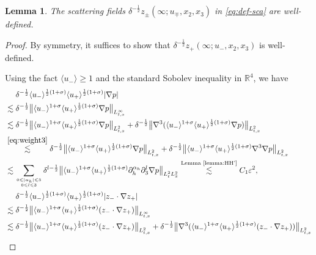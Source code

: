 \documentclass[10pt,reqno]{amsart}
\numberwithin{equation}{section}
\newtheorem{lemma}[theorem]{Lemma}
\begin{document}
\begin{lemma}\label{welldefined}
The scattering fields $\delta^{-\frac{1}{2}}z_{\pm}(\infty;u_\mp,x_2,x_3)$ in \eqref{eq:def-sca} are well-defined.
\end{lemma}
\begin{proof}
By symmetry, it suffices to show that $\delta^{-\frac{1}{2}}z_{+}(\infty;u_-,x_2,x_3)$ is well-defined. 

Using the fact $\langle u_-\rangle\geqslant 1$ and the standard Sobolev inequality in $\mathbb{R}^4$, we have 
\begin{align*}
&\ \ \ \ \delta^{-\frac{1}{2}}\langle u_-\rangle^{\frac{1}{2}(1+\sigma)}\langle u_+\rangle^{\frac{1}{2}(1+\sigma)} |\nabla p|\\
&\lesssim\delta^{-\frac{1}{2}}\big\|\langle u_-\rangle^{1+\sigma}\langle u_+\rangle^{\frac{1}{2}(1+\sigma)} \nabla p\big\|_{L^\infty_{t,x}}\\
&\lesssim\delta^{-\frac{1}{2}}\big\|\langle u_-\rangle^{1+\sigma}\langle u_+\rangle^{\frac{1}{2}(1+\sigma)} \nabla p\big\|_{L^2_{t,x}}+\delta^{-\frac{1}{2}}\big\|\nabla^3(\langle u_-\rangle^{1+\sigma}\langle u_+\rangle^{\frac{1}{2}(1+\sigma)} \nabla p)\big\|_{L^2_{t,x}}\\
&\stackrel{\eqref{eq:weight3}}{\lesssim}\delta^{-\frac{1}{2}}\big\|\langle u_-\rangle^{1+\sigma}\langle u_+\rangle^{\frac{1}{2}(1+\sigma)} \nabla p\big\|_{L^2_{t,x}}+\delta^{-\frac{1}{2}}\big\|\langle u_-\rangle^{1+\sigma}\langle u_+\rangle^{\frac{1}{2}(1+\sigma)} \nabla^3 \nabla p\big\|_{L^2_{t,x}}\\
&\lesssim
\sum_{0\leqslant|\alpha_h|\leqslant 3\atop 0\leqslant l\leqslant 3}\delta^{l-\frac{1}{2}}\big\|\langle u_-\rangle^{1+\sigma}\langle u_+\rangle^{\frac{1}{2}(1+\sigma)}\partial_{h}^{\alpha_h}\partial_3^l \nabla p\big\|_{L^2_tL^2_x}
\stackrel{\text{Lemma \ref{lemma:HH'}}}{\lesssim}C_1\varepsilon^2,\\
	&\ \ \ \ \delta^{-\frac{1}{2}}\langle u_-\rangle^{\frac{1}{2}(1+\sigma)}\langle u_+\rangle^{\frac{1}{2}(1+\sigma)} |z_-\cdot\nabla z_+|\\
	&\lesssim \delta^{-\frac{1}{2}}\big\|\langle u_-\rangle^{1+\sigma}\langle u_+\rangle^{\frac{1}{2}(1+\sigma)} (z_-\cdot\nabla z_+)\big\|_{L^\infty_{t,x}}\\
	&\lesssim\delta^{-\frac{1}{2}}\big\|\langle u_-\rangle^{1+\sigma}\langle u_+\rangle^{\frac{1}{2}(1+\sigma)} (z_-\cdot\nabla z_+)\big\|_{L^2_{t,x}}+\delta^{-\frac{1}{2}}\big\|\nabla^3(\langle u_-\rangle^{1+\sigma}\langle u_+\rangle^{\frac{1}{2}(1+\sigma)} (z_-\cdot\nabla z_+))\big\|_{L^2_{t,x}}\\

\end{align*}
\end{proof}
\end{document}
